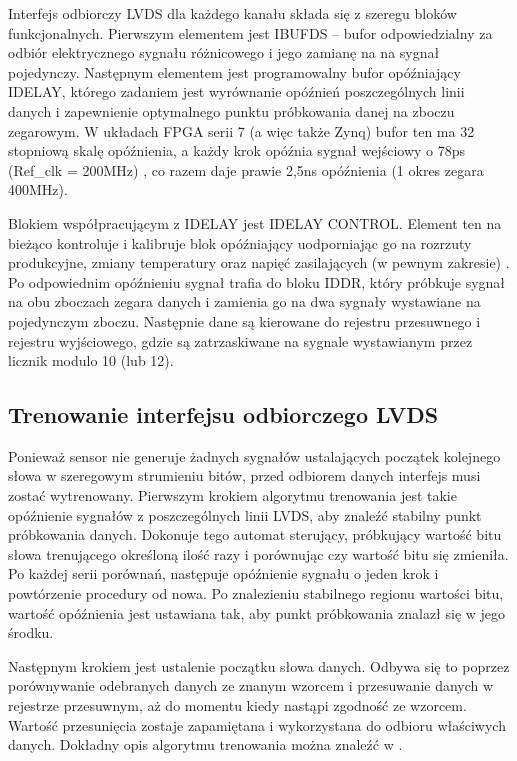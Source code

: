 \documentclass[a4paper,11pt,oneside]{report}  %
\begin{document}
Interfejs odbiorczy LVDS dla każdego kanału składa się z szeregu bloków funkcjonalnych. Pierwszym elementem jest IBUFDS – bufor odpowiedzialny za odbiór elektrycznego sygnału różnicowego i jego zamianę na na sygnał pojedynczy. Następnym elementem jest programowalny bufor opóźniający IDELAY, którego zadaniem jest wyrównanie opóźnień poszczególnych linii danych i zapewnienie optymalnego punktu próbkowania danej na zboczu zegarowym. W układach FPGA serii 7 (a więc także Zynq) bufor ten ma 32 stopniową skalę opóźnienia, a każdy krok opóźnia sygnał wejściowy o 78ps (Ref\_clk = 200MHz) \cite{10}, co razem daje prawie 2,5ns opóźnienia (1 okres zegara 400MHz). 

Blokiem współpracującym z IDELAY jest IDELAY CONTROL. Element ten na bieżąco kontroluje i kalibruje blok opóźniający uodporniając go na rozrzuty produkcyjne, zmiany temperatury oraz napięć zasilających (w pewnym zakresie) \cite{11}. Po odpowiednim opóźnieniu sygnał trafia do bloku IDDR, który próbkuje sygnał na obu zboczach zegara danych i zamienia go na dwa sygnały wystawiane na pojedynczym zboczu. Następnie dane są kierowane do rejestru przesuwnego i rejestru wyjściowego, gdzie są zatrzaskiwane na sygnale wystawianym przez licznik modulo 10 (lub 12).

\subsection{Trenowanie interfejsu odbiorczego LVDS}
Ponieważ sensor nie generuje żadnych sygnałów ustalających początek kolejnego słowa w szeregowym strumieniu bitów, przed odbiorem danych interfejs musi zostać wytrenowany. Pierwszym krokiem algorytmu trenowania jest takie opóźnienie sygnałów z poszczególnych linii LVDS, aby znaleźć stabilny punkt próbkowania danych. Dokonuje tego automat sterujący, próbkujący wartość bitu słowa trenującego określoną ilość razy i porównując czy wartość bitu się zmieniła. Po każdej serii porównań, następuje opóźnienie sygnału o jeden krok i powtórzenie procedury od nowa. Po znalezieniu stabilnego regionu wartości bitu, wartość opóźnienia jest ustawiana tak, aby punkt próbkowania znalazł się w jego środku. 

Następnym krokiem jest ustalenie początku słowa danych. Odbywa się to poprzez porównywanie odebranych danych ze znanym wzorcem i przesuwanie danych w rejestrze przesuwnym, aż do momentu kiedy nastąpi zgodność ze wzorcem. Wartość przesunięcia zostaje zapamiętana i wykorzystana do odbioru właściwych danych. Dokładny opis algorytmu trenowania można znaleźć w \cite{12}.
\end{document}

